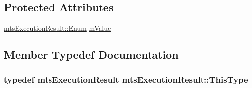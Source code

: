 \subsection*{Protected Attributes}
\begin{DoxyCompactItemize}
\item 
\hyperlink{classmts_execution_result_a10c4246c82ac99d88e5f716f79407b77}{mts\-Execution\-Result\-::\-Enum} \hyperlink{classmts_execution_result_a0b60b355759b76735da6062d9867ff85}{m\-Value}
\end{DoxyCompactItemize}


\subsection{Member Typedef Documentation}
\hypertarget{classmts_execution_result_a8b0081f3c70da65307a17faace94b176}{
\subsubsection[{This\-Type}]{\setlength{\rightskip}{0pt plus 5cm}typedef {\bf mts\-Execution\-Result} {\bf mts\-Execution\-Result\-::\-This\-Type}}}\label{classmts_execution_result_a8b0081f3c70da65307a17faace94b176}


